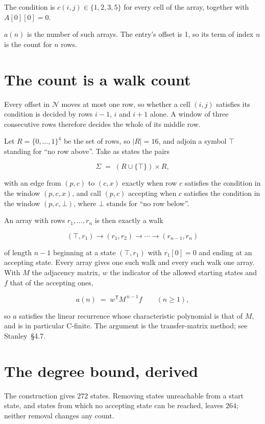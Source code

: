 \documentclass[11pt]{article}
\theoremstyle{definition}
\begin{document}
The condition is $c(i,j) \in \{1, 2, 3, 5\}$ for every cell of the array, together with $A[0][0]=0$.

$a(n)$ is the number of such arrays. The entry's offset is 1, so its term of index $n$ is the count for $n$ rows.

\section{The count is a walk count}

Every offset in $\mathcal{N}$ moves at most one row, so whether a cell $(i,j)$ satisfies its condition is decided by rows $i-1$, $i$ and $i+1$ alone. A window of three consecutive rows therefore decides the whole of its middle row.

Let $R = \{0,\dots,1\}^{4}$ be the set of rows, so $|R| = 16$, and adjoin a symbol $\top$ standing for ``no row above''. Take as states the pairs

\[\Sigma \;=\; (R \cup \{\top\}) \times R,\]

with an edge from $(p,c)$ to $(c,x)$ exactly when row $c$ satisfies the condition in the window $(p,c,x)$, and call $(p,c)$ accepting when $c$ satisfies the condition in the window $(p,c,\bot)$, where $\bot$ stands for ``no row below''.

An array with rows $r_1,\dots,r_n$ is then exactly a walk

\[(\top,r_1) \to (r_1,r_2) \to \cdots \to (r_{n-1},r_n)\]

of length $n-1$ beginning at a state $(\top,r_1)$ with $r_1[0]=0$ and ending at an accepting state. Every array gives one such walk and every such walk one array. With $M$ the adjacency matrix, $w$ the indicator of the allowed starting states and $f$ that of the accepting ones,

\[a(n) \;=\; w^{\mathsf T} M^{\,n-1} f \qquad (n \ge 1),\]

so $a$ satisfies the linear recurrence whose characteristic polynomial is that of $M$, and is in particular C-finite. The argument is the transfer-matrix method; see Stanley~\S4.7.

\section{The degree bound, derived}

The construction gives $272$ states. Removing states unreachable from a start state, and states from which no accepting state can be reached, leaves $264$; neither removal changes any count.
\end{document}
